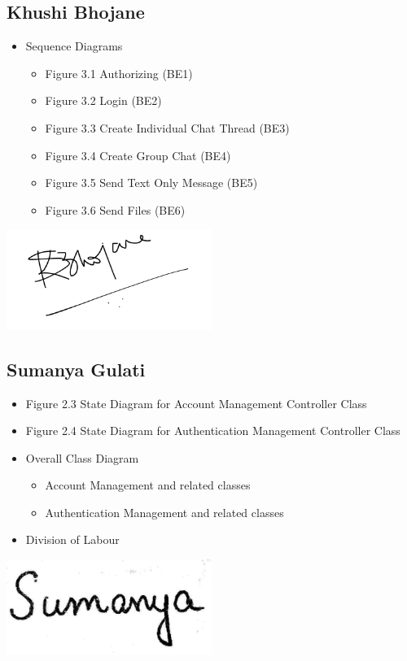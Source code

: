 \documentclass[]{article}
\begin{document}
\subsection{Khushi Bhojane}
\label{subsec:khushi_bhojane}
\begin{itemize}
	\item Sequence Diagrams
 		\begin{itemize}
   			\item Figure 3.1 Authorizing (BE1)
      			\item Figure 3.2 Login (BE2)
	 		\item Figure 3.3 Create Individual Chat Thread (BE3)
    			\item Figure 3.4 Create Group Chat (BE4)
       			\item Figure 3.5 Send Text Only Message (BE5)
	  		\item Figure 3.6 Send Files (BE6)
      		\end{itemize}
\end{itemize}
\includegraphics[width=0.5\textwidth]{khushi_signature.png}

\subsection{Sumanya Gulati}
\label{subsec:sumanya_gulati}
\begin{itemize}
	\item Figure 2.3 State Diagram for Account Management Controller Class
 	\item Figure 2.4 State Diagram for Authentication Management Controller Class
	\item Overall Class Diagram
 		\begin{itemize}
   			\item Account Management and related classes
      			\item Authentication Management and related classes
      		\end{itemize}
	\item Division of Labour
\end{itemize}
\includegraphics[width=0.5\textwidth]{signature.jpeg}
\end{document}
